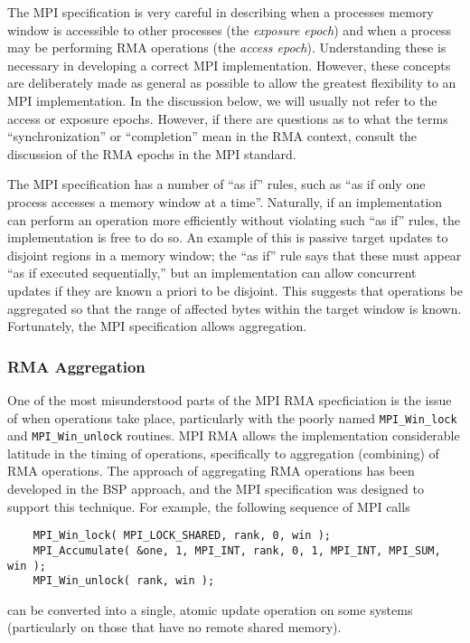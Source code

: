 \documentclass{article}
\def\code#1{\texttt{#1}}
\begin{document}
%
The MPI specification is very careful in describing when a processes
memory window is accessible to other processes (the \emph{exposure
epoch}) and when a process may be performing RMA operations (the
\emph{access epoch}).  Understanding these is necessary in developing
a correct MPI implementation.  However, these concepts are
deliberately made as general as possible to allow the greatest
flexibility to an MPI implementation.  In the discussion below, we
will usually not refer to the access or exposure epochs.  However, if
there are questions as to what the terms ``synchronization'' or
``completion'' mean in the RMA context, consult the discussion of the
RMA epochs in the MPI standard.

The MPI specification has a number of ``as if'' rules, such as ``as if
only one process accesses a memory window at a time''.  Naturally, if
an implementation can perform an operation more efficiently without
violating such ``as if'' rules, the implementation is free to do so.
An example of this is passive target updates to disjoint regions in a
memory window; 
the ``as if'' rule says that these must appear ``as if executed
sequentially,'' but an implementation can allow concurrent updates if
they are known a priori to be disjoint.  This suggests that operations
be aggregated so that the range of affected bytes within the target
window is known.  Fortunately, the MPI specification allows aggregation.

\subsubsection{RMA Aggregation}
One of the most misunderstood parts of the MPI RMA specficiation is
the issue of when operations take place, particularly with the poorly
named \code{MPI_Win_lock} and \code{MPI_Win_unlock} routines.  MPI RMA
allows the implementation considerable latitude in the timing of
operations, specifically to aggregation (combining) of RMA
operations.  The approach of aggregating RMA operations has been
developed in the BSP approach, and the MPI specification was designed
to support this technique.  For example, the following sequence of MPI
calls
\begin{verbatim}
    MPI_Win_lock( MPI_LOCK_SHARED, rank, 0, win );
    MPI_Accumulate( &one, 1, MPI_INT, rank, 0, 1, MPI_INT, MPI_SUM, win );
    MPI_Win_unlock( rank, win );
\end{verbatim}
can be converted into a single, atomic update operation on some
systems (particularly on those that have no remote shared memory).
\end{document}
